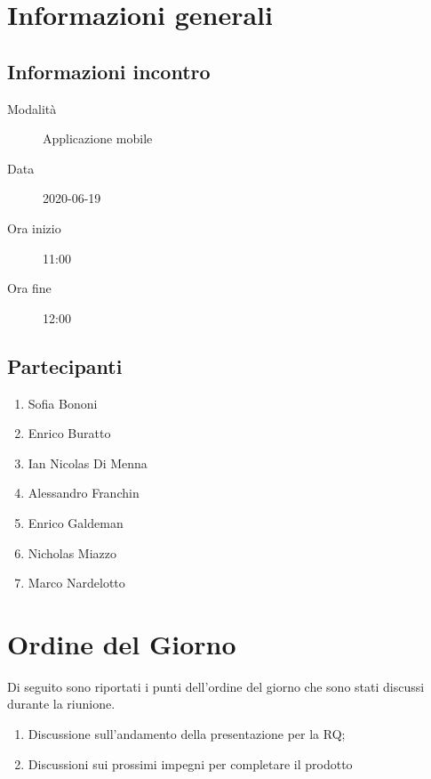 \documentclass{article}
\begin{document}


\section{Informazioni generali}%
\label{sec:informazioni_generali}

\subsection{Informazioni incontro}%
\label{sub:informazioni_incontro}

\begin{description}
  \item[Modalità] Applicazione mobile 
  \item[Data] 2020-06-19
  \item[Ora inizio] 11:00
  \item[Ora fine] 12:00
\end{description}

\subsection{Partecipanti}%
\label{sub:partecipanti}

\begin{enumerate}
  \item Sofia Bononi
  \item Enrico Buratto
  \item Ian Nicolas Di Menna
  \item Alessandro Franchin
  \item Enrico Galdeman
  \item Nicholas Miazzo
  \item Marco Nardelotto
\end{enumerate}

\section{Ordine del Giorno}%
\label{ordine_del_giorno}
Di seguito sono riportati i punti dell'ordine del giorno che sono stati discussi durante la riunione.
\begin{enumerate}
  \item Discussione sull'andamento della presentazione per la RQ;
  \item Discussioni sui prossimi impegni per completare il prodotto
\end{enumerate}
\end{document}
